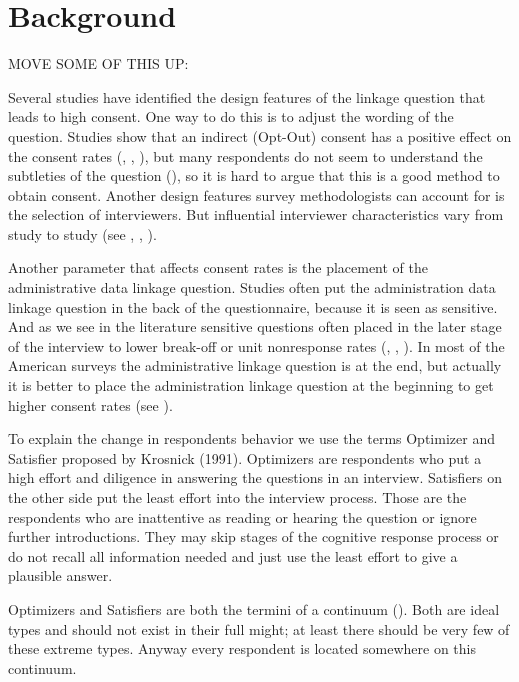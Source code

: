 \section{Background}

MOVE SOME OF THIS UP:

Several studies have identified the design features of the linkage question that leads to high consent. One way to do this is to adjust the wording of the question. Studies show that an indirect (Opt-Out) consent has a positive effect on the consent rates (\cite{Batesetal05}, \cite{Pascale11}, \cite{Dasetal14}), but many respondents do not seem to understand the subtleties of the question (\cite{Batesetal05}), so it is hard to argue that this is a good method to obtain consent. Another design features survey methodologists can account for is the selection of interviewers. But influential interviewer characteristics vary from study to study (see \cite{Beste11}, \cite{Sakshaugetal13}, \cite{Salaetal10}).

Another parameter that affects consent rates is the placement of the administrative data linkage question. Studies often put the administration data linkage question in the back of the questionnaire, because it is seen as sensitive. And as we see in the literature sensitive questions often placed in the later stage of the interview to lower break-off or unit nonresponse rates (\cite{Cantoretal02}, \cite{Sudmanetal82}, \cite{Tourangeauetal07}). In most of the American surveys the administrative linkage question is at the end, but actually it is better to place the administration linkage question at the beginning to get higher consent rates (see \cite{Sakshaugetal13}).

To explain the change in respondents behavior we use the terms Optimizer and Satisfier proposed by Krosnick (1991). Optimizers are respondents who put a high effort and diligence in answering the questions in an interview. Satisfiers on the other side put the least effort into the interview process. Those are the respondents who are inattentive as reading or hearing the question or ignore further introductions. They may skip stages of the cognitive response process or do not recall all information needed and just use the least effort to give a plausible answer.

Optimizers and Satisfiers are both the termini of a continuum (\cite{Krosnick99}). Both are ideal types and should not exist in their full might; at least there should be very few of these extreme types. Anyway every respondent is located somewhere on this continuum.

